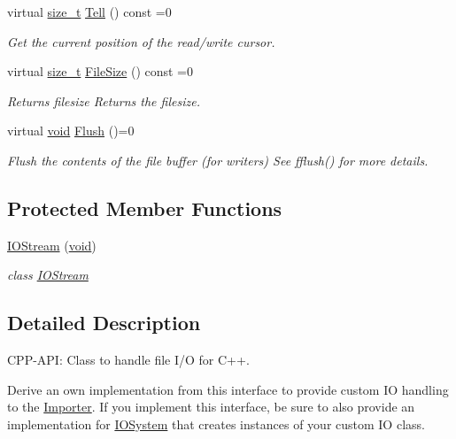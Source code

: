 \begin{DoxyCompactItemize}
virtual \hyperlink{_s_d_l__config_8h_a7c94ea6f8948649f8d181ae55911eeaf}{size\-\_\-t} \hyperlink{class_assimp_1_1_i_o_stream_a316ac6cd16b5a493d1313f792c806194}{Tell} () const =0
\begin{DoxyCompactList}\small\item\em Get the current position of the read/write cursor. \end{DoxyCompactList}\item 
virtual \hyperlink{_s_d_l__config_8h_a7c94ea6f8948649f8d181ae55911eeaf}{size\-\_\-t} \hyperlink{class_assimp_1_1_i_o_stream_aaa01183d197fb714f28d6c611b6fa058}{File\-Size} () const =0
\begin{DoxyCompactList}\small\item\em Returns filesize Returns the filesize. \end{DoxyCompactList}\item 
virtual \hyperlink{_s_d_l__opengl_8h_a3db05964a3cc4410f35b7ea2b7eb850d}{void} \hyperlink{class_assimp_1_1_i_o_stream_a7c19952446ece90924b246f087417899}{Flush} ()=0
\begin{DoxyCompactList}\small\item\em Flush the contents of the file buffer (for writers) See fflush() for more details. \end{DoxyCompactList}\end{DoxyCompactItemize}
\subsection*{Protected Member Functions}
\begin{DoxyCompactItemize}
\item 
\hyperlink{class_assimp_1_1_i_o_stream_af5ae78123b6c6f7afc31b2a52dc9192e}{I\-O\-Stream} (\hyperlink{_s_d_l__opengl_8h_a3db05964a3cc4410f35b7ea2b7eb850d}{void})
\begin{DoxyCompactList}\small\item\em class \hyperlink{class_assimp_1_1_i_o_stream}{I\-O\-Stream} \end{DoxyCompactList}\end{DoxyCompactItemize}


\subsection{Detailed Description}
C\-P\-P-\/\-A\-P\-I\-: Class to handle file I/\-O for C++. 

Derive an own implementation from this interface to provide custom I\-O handling to the \hyperlink{class_assimp_1_1_importer}{Importer}. If you implement this interface, be sure to also provide an implementation for \hyperlink{class_assimp_1_1_i_o_system}{I\-O\-System} that creates instances of your custom I\-O class. 

